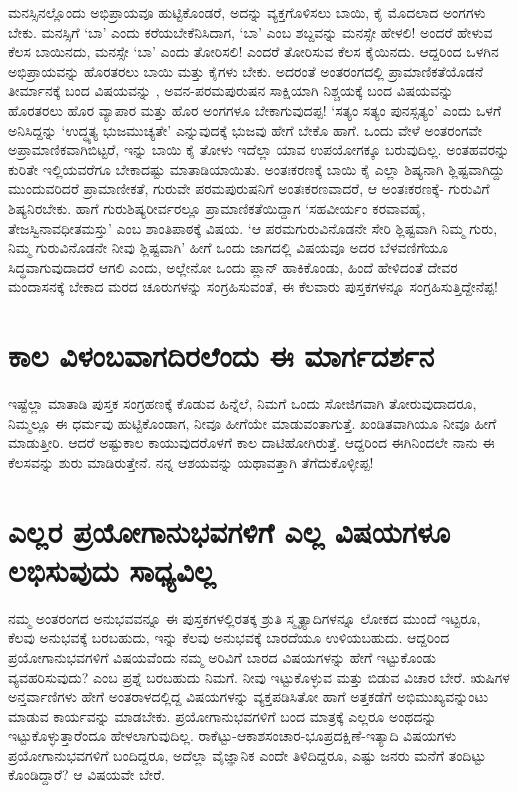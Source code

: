 ಮನಸ್ಸಿನಲ್ಲೊಂದು ಅಭಿಪ್ರಾಯವೂ ಹುಟ್ಟಿಕೊಂಡರೆ, ಅದನ್ನು ವ್ಯಕ್ತಗೊಳಿಸಲು ಬಾಯಿ, ಕೈ ಮೊದಲಾದ ಅಂಗಗಳು ಬೇಕು. ಮನಸ್ಸಿಗೆ `ಬಾ' ಎಂದು ಕರೆಯಬೇಕೆನಿಸಿದಾಗ, `ಬಾ' ಎಂಬ ಶಬ್ದವನ್ನು ಮನಸ್ಸೇ ಹೇಳಲಿ! ಅಂದರೆ ಹೇಳುವ ಕೆಲಸ ಬಾಯಿನದು, ಮನಸ್ಸೇ `ಬಾ' ಎಂದು ತೋರಿಸಲಿ! ಎಂದರೆ ತೋರಿಸುವ ಕೆಲಸ ಕೈಯಿನದು. ಆದ್ದರಿಂದ ಒಳಗಿನ ಅಭಿಪ್ರಾಯವನ್ನು ಹೊರತರಲು ಬಾಯಿ ಮತ್ತು ಕೈಗಳು ಬೇಕು. ಅದರಂತೆ ಅಂತರಂಗದಲ್ಲಿ ಪ್ರಾಮಾಣಿಕತೆಯೊಡನೆ ತೀರ್ಮಾನಕ್ಕೆ ಬಂದ ವಿಷಯವನ್ನು , ಅವನ-ಪರಮಪುರುಷನ ಸಾಕ್ಷಿಯಾಗಿ ನಿಶ್ಚಯಕ್ಕೆ ಬಂದ ವಿಷಯವನ್ನು ಹೊರತರಲು ಹೊರ ವ್ಯಾಪಾರ ಮತ್ತು ಹೊರ ಅಂಗಗಳೂ ಬೇಕಾಗುವುದಪ್ಪ! `ಸತ್ಯಂ ಸತ್ಯಂ ಪುನಸ್ಸತ್ಯಂ'\label{130a} ಎಂದು ಒಳಗೆ ಅನಿಸಿದ್ದನ್ನು `ಉದ್ಧ್ಯತ್ಯ ಭುಜಮುಚ್ಯತೇ'\label{130} ಎನ್ನುವುದಕ್ಕೆ ಭುಜವು ಹೇಗೆ ಬೇಕೊ ಹಾಗೆ. ಒಂದು ವೇಳೆ ಅಂತರಂಗವೇ ಅಪ್ರಾಮಾಣಿಕವಾಗಿಬಿಟ್ಟರೆ, ಇನ್ನು ಬಾಯಿ ಕೈ ತೋಳು ಇದೆಲ್ಲಾ ಯಾವ ಉಪಯೋಗಕ್ಕೂ ಬರುವುದಿಲ್ಲ. ಅಂತಹವರನ್ನು ಕುರಿತೇ ಇಲ್ಲಿಯವರೆಗೂ ಬೇಕಾದಷ್ಟು ಮಾತಾಡಿಯಾಯಿತು. ಅಂತಃಕರಣಕ್ಕೆ ಬಾಯಿ ಕೈ ಎಲ್ಲಾ ಶಿಷ್ಯನಾಗಿ ಶ್ಲಿಷ್ಟವಾಗಿದ್ದು ಮುಂದುವರಿದರೆ ಪ್ರಾಮಾಣೀಕತೆ, ಗುರುವೇ ಪರಮಪುರುಷನಿಗೆ ಅಂತಃಕರಣವಾದರೆ, ಆ ಅಂತಃಕರಣಕ್ಕೆ- ಗುರುವಿಗೆ ಶಿಷ್ಯನಿರಬೇಕು. ಹಾಗೆ ಗುರುಶಿಷ್ಯರೀರ್ವರಲ್ಲೂ ಪ್ರಾಮಾಣಿಕತೆಯಿದ್ದಾಗ `ಸಹವೀರ್ಯಂ ಕರವಾವಹೈ, ತೇಜಸ್ವಿನಾವಧೀತಮಸ್ತು'  ಎಂಬ ಶಾಂತಿಪಾಠಕ್ಕೆ ವಿಷಯ. `ಆ ಪರಮಗುರುವಿನೊಡನೇ ಸೇರಿ ಶ್ಲಿಷ್ಟವಾಗಿ ನಿಮ್ಮ ಗುರು, ನಿಮ್ಮ ಗುರುವಿನೊಡನೇ ನೀವು ಶ್ಲಿಷ್ಟವಾಗಿ' ಹೀಗೆ ಒಂದು ಜಾಗದಲ್ಲಿ ವಿಷಯವೂ ಅದರ ಬೆಳವಣಿಗೆಯೂ ಸಿದ್ಧವಾಗುವುದಾದರೆ ಆಗಲಿ ಎಂದು, ಅಲ್ಲೇನೋ ಒಂದು ಪ್ಲಾನ್ ಹಾಕಿಕೊಂಡು, ಹಿಂದೆ ಹೇಳಿದಂತೆ ದೇವರ ಮಂದಾಸನಕ್ಕೆ ಬೇಕಾದ ಮರದ ಚೂರುಗಳನ್ನು ಸಂಗ್ರಹಿಸುವಂತೆ, ಈ ಕೆಲವಾರು ಪುಸ್ತಕಗಳನ್ನೂ ಸಂಗ್ರಹಿಸುತ್ತಿದ್ದೇನೆಪ್ಪ!

\section*{ಕಾಲ ವಿಳಂಬವಾಗದಿರಲೆಂದು ಈ ಮಾರ್ಗದರ್ಶನ}

ಇಷ್ಟೆಲ್ಲಾ ಮಾತಾಡಿ ಪುಸ್ತಕ ಸಂಗ್ರಹಣಕ್ಕೆ ಕೊಡುವ ಹಿನ್ನೆಲೆ, ನಿಮಗೆ ಒಂದು ಸೋಜಿಗವಾಗಿ ತೋರುವುದಾದರೂ, ನಿಮ್ಮಲ್ಲೂ ಈ ಧರ್ಮವು ಹುಟ್ಟಿಕೊಂಡಾಗ, ನೀವೂ ಹೀಗೆಯೇ ಮಾಡುವಂತಾಗುತ್ತೆ. ಖಂಡಿತವಾಗಿಯೂ ನೀವೂ ಹೀಗೆ ಮಾಡುತ್ತೀರಿ. ಆದರೆ ಅಷ್ಟುಕಾಲ ಕಾಯುವುದರೊಳಗೆ ಕಾಲ ದಾಟಿಹೋಗಿರುತ್ತೆ. ಆದ್ದರಿಂದ ಈಗಿನಿಂದಲೇ ನಾನು ಈ ಕೆಲಸವನ್ನು ಶುರು ಮಾಡಿರುತ್ತೇನೆ. ನನ್ನ ಆಶಯವನ್ನು ಯಥಾವತ್ತಾಗಿ ತೆಗೆದುಕೊಳ್ಳೀಪ್ಪ!

\section*{ಎಲ್ಲರ ಪ್ರಯೋಗಾನುಭವಗಳಿಗೆ ಎಲ್ಲ ವಿಷಯಗಳೂ ಲಭಿಸುವುದು ಸಾಧ್ಯವಿಲ್ಲ}

ನಮ್ಮ ಅಂತರಂಗದ ಅನುಭವವನ್ನೂ ಈ ಪುಸ್ತಕಗಳಲ್ಲಿರತಕ್ಕ ಶ್ರುತಿ ಸ್ಮೃತ್ಯಾದಿಗಳನ್ನೂ ಲೋಕದ ಮುಂದೆ ಇಟ್ಟರೂ, ಕೆಲವು ಅನುಭವಕ್ಕೆ ಬರಬಹುದು, ಇನ್ನು ಕೆಲವು ಅನುಭವಕ್ಕೆ ಬಾರದೆಯೂ ಉಳಿಯಬಹುದು. ಆದ್ದರಿಂದ ಪ್ರಯೋಗಾನುಭವಗಳಿಗೆ ವಿಷಯವೆಂದು ನಮ್ಮ ಅರಿವಿಗೆ ಬಾರದ ವಿಷಯಗಳನ್ನು ಹೇಗೆ ಇಟ್ಟುಕೊಂಡು ವ್ಯವಹರಿಸುವುದು? ಎಂಬ ಪ್ರಶ್ನೆ ಬರಬಹುದು ನಿಮಗೆ. ನೀವು ಇಟ್ಟುಕೊಳ್ಳುವ ಮತ್ತು ಬಿಡುವ ವಿಚಾರ ಬೇರೆ. ಋಷಿಗಳ ಅನ್ತರ್ವಾಣಿಗಳು ಹೇಗೆ ಅಂತರಾಳದಲ್ಲಿದ್ದ ವಿಷಯಗಳನ್ನು  ವ್ಯಕ್ತಪಡಿಸಿತೋ ಹಾಗೆ ಅತ್ತಕಡೆಗೆ ಅಭಿಮುಖ್ಯವನ್ನುಂಟು ಮಾಡುವ ಕಾರ್ಯವನ್ನು ಮಾಡಬೇಕು. ಪ್ರಯೋಗಾನುಭವಗಳಿಗೆ ಬಂದ ಮಾತ್ರಕ್ಕೆ ಎಲ್ಲರೂ ಅಂಥದನ್ನು ಇಟ್ಟುಕೊಳ್ಳುತ್ತಾರೆಂದೂ ಹೇಳಲಾಗುವುದಿಲ್ಲ. ರಾಕೆಟ್ಟು-ಆಕಾಶಸಂಚಾರ-ಭೂಪ್ರದಕ್ಷಿಣೆ-ಇತ್ಯಾದಿ ವಿಷಯಗಳು ಪ್ರಯೋಗಾನುಭವಗಳಿಗೆ ಬಂದಿದ್ದರೂ, ಅದೆಲ್ಲಾ ವೈಜ್ಞಾನಿಕ ಎಂದೇ ತಿಳಿದಿದ್ದರೂ, ಎಷ್ಟು ಜನರು ಮನೆಗೆ ತಂದಿಟ್ಟು ಕೊಂಡಿದ್ದಾರೆ? ಆ ವಿಷಯವೇ ಬೇರೆ.

